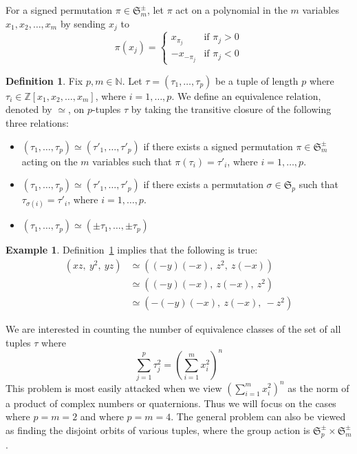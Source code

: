 \documentclass[12pt]{article}
\theoremstyle{definition}
\newtheorem{definition}[theorem]{Definition}
\newtheorem{example}[theorem]{Example}
\numberwithin{equation}{section}
\begin{document}

For a signed permutation \( \pi \in \mathfrak{S}_m^\pm \), let \( \pi \) act on a polynomial in the 
\(m\) variables \( x_1,x_2, \ldots, x_m \) by sending \( x_j \) to 
\[
\pi(x_j) =
\begin{cases}
x_{\pi_j} & \text{if } \pi_j > 0 \\
-x_{-\pi_j} & \text{if } \pi_j < 0
\end{cases}
\]

\begin{definition}
\label{def:general}
Fix \( p, m \in \mathbb{N} \). 
Let \( \tau = ( \tau_1, \ldots, \tau_p) \)
be a tuple of length \( p \) where 
\( \tau_i \in \mathbb{Z}[x_1,x_2, \ldots, x_m] \), where \( i = 1, \ldots, p \).
We define an equivalence relation, denoted by \( \simeq \), on \(p\)-tuples
\( \tau \) 
by taking the transitive closure of the following three relations:
\begin{itemize}
\item
\( ( \tau_1, \ldots, \tau_p) \simeq ( \tau'_1, \ldots, \tau'_p) \)
if there exists a signed permutation \( \pi \in \mathfrak{S}_m^\pm \)
acting on the \( m \) variables such that \( \pi( \tau_i ) = \tau'_i \),
 where \( i = 1, \ldots, p \).
\item
\( ( \tau_1, \ldots, \tau_p) \simeq ( \tau'_1, \ldots, \tau'_p) \)
if there exists a permutation \( \sigma \in \mathfrak{S}_p \)
such that \( \tau_{\sigma(i)} = \tau'_i \), where \( i = 1, \ldots, p \).
\item
\( ( \tau_1, \ldots, \tau_p) \simeq ( \pm \tau_1, \ldots, \pm \tau_p) \)
\end{itemize}
\end{definition}


\begin{example}
Definition~\ref{def:general} implies that the following is true:
\begin{align*}
( xz,\: y^2,\: yz )  
&\simeq ( (-y)(-x),\: z^2,\: z(-x) ) \\
&\simeq ( (-y)(-x),\: z(-x),\: z^2 ) \\
&\simeq ( -(-y)(-x),\: z(-x),\: -z^2 ) 
\end{align*}
\end{example}



We are interested in counting the number of
equivalence classes of the set of all tuples \( \tau \) where 
\[
\sum_{j = 1}^{p}  \tau_j ^ 2  
= 
\left( \sum_{i = 1}^{m}  x_i ^ 2  \right) ^ n 
\] 
This problem is most easily attacked when we
view \( \left( \sum_{i = 1}^{m}  x_i ^ 2  \right) ^ n \)
as the norm of a product of complex numbers or quaternions.
Thus we will focus on the cases where \( p = m = 2 \) and where \( p = m = 4 \).
The general problem can also be viewed as finding the disjoint orbits of 
various tuples, where the group action is \( \mathfrak{S}_p^\pm \times \mathfrak{S}_m^\pm \).
\end{document}

